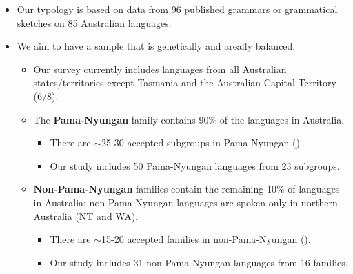 \documentclass{article}
\begin{document}
\begin{itemize}
    \item Our typology is based on data from 96 published grammars or grammatical sketches on 85  Australian languages.
    
    
    \item We aim to have a sample that is genetically and areally balanced.
    \begin{itemize}
           \item Our survey currently includes languages from all Australian states/territories except Tasmania and the Australian Capital Territory (6/8).
             \item The {\bf Pama-Nyungan} family contains 90\% of the languages in Australia.
        
        \begin{itemize}
            \item There are $\sim$25-30 accepted subgroups in Pama-Nyungan (\citealt{bowernatkinson12,ogradyvoegelin66}). 
        \item Our study includes 50 Pama-Nyungan languages from 23 subgroups.
        \end{itemize}
        \item {\bf Non-Pama-Nyungan} families contain the remaining 10\% of languages in Australia; non-Pama-Nyungan languages are spoken only in northern Australia (NT and WA).
        \begin{itemize}
         \item There are $\sim$15-20 accepted families in non-Pama-Nyungan (\citealt[xv]{kn14}).
        \item Our study includes 31 non-Pama-Nyungan languages from 16 families.
        \end{itemize}
    

\end{itemize}
\end{itemize}
\end{document}
